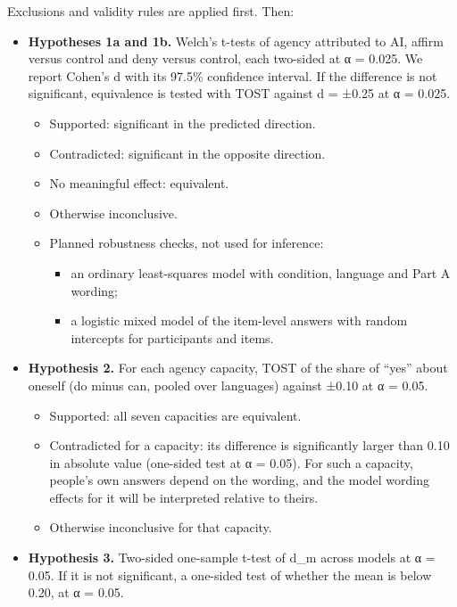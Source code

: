 \documentclass[
  11pt,
]{article}
\providecommand{\tightlist}{%
  \setlength{\itemsep}{0pt}\setlength{\parskip}{0pt}}
\begin{document}
Exclusions and validity rules are applied first. Then:

\begin{itemize}
\tightlist
\item
  \textbf{Hypotheses 1a and 1b.} Welch's t-tests of agency attributed to
  AI, affirm versus control and deny versus control, each two-sided at α
  = 0.025. We report Cohen's d with its 97.5\% confidence interval. If
  the difference is not significant, equivalence is tested with TOST
  against d = ±0.25 at α = 0.025.

  \begin{itemize}
  \tightlist
  \item
    Supported: significant in the predicted direction.
  \item
    Contradicted: significant in the opposite direction.
  \item
    No meaningful effect: equivalent.
  \item
    Otherwise inconclusive.
  \item
    Planned robustness checks, not used for inference:

    \begin{itemize}
    \tightlist
    \item
      an ordinary least-squares model with condition, language and Part
      A wording;
    \item
      a logistic mixed model of the item-level answers with random
      intercepts for participants and items.
    \end{itemize}
  \end{itemize}
\item
  \textbf{Hypothesis 2.} For each agency capacity, TOST of the share of
  ``yes'' about oneself (do minus can, pooled over languages) against
  ±0.10 at α = 0.05.

  \begin{itemize}
  \tightlist
  \item
    Supported: all seven capacities are equivalent.
  \item
    Contradicted for a capacity: its difference is significantly larger
    than 0.10 in absolute value (one-sided test at α = 0.05). For such a
    capacity, people's own answers depend on the wording, and the model
    wording effects for it will be interpreted relative to theirs.
  \item
    Otherwise inconclusive for that capacity.
  \end{itemize}
\item
  \textbf{Hypothesis 3.} Two-sided one-sample t-test of d\_m across
  models at α = 0.05. If it is not significant, a one-sided test of
  whether the mean is below 0.20, at α = 0.05.


\end{itemize}
\end{document}
